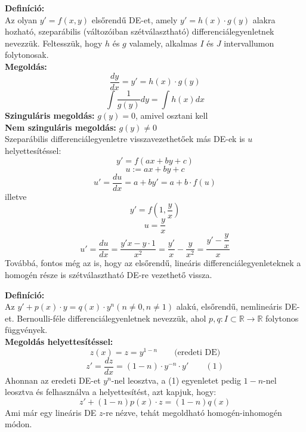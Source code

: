 \documentclass[11pt,a4paper]{article}
\begin{document}
    \begin{tcolorbox}[colback=red!5!white,colframe=red!60!black,title= 1. Szeparábilis és arra visszavezethető DE]
        \textbf{Definíció:} \\
        Az olyan $y' = f(x,y)$ elsőrendű DE-et, amely $y' = h(x) \cdot g(y)$ alakra hozható, szeparábilis (változóiban szétválasztható) differenciálegyenletnek nevezzük. Feltesszük, hogy $h$ és $g$ valamely, alkalmas $I$ és $J$ intervallumon folytonosak. \\
        \textbf{Megoldás:} \\
        $$\dfrac{dy}{dx} = y' = h(x) \cdot g(y)$$
        $$\int\dfrac{1}{g(y)}dy = \int h(x)dx$$
        \textbf{Szinguláris megoldás:} $g(y) = 0$, amivel osztani kell \\
        \textbf{Nem szinguláris megoldás:} $g(y) \neq 0$ \\
        Szeparábilis differenciálegyenletre visszavezethetőek más DE-ek is $u$ helyettesítéssel:
        $$y' = f(ax + by + c)$$
        $$u := ax + by + c$$
        $$u' = \dfrac{du}{dx} = a + by' = a + b \cdot f(u)$$
        illetve
        $$y' = f(1,\dfrac{y}{x})$$
        $$u = \dfrac{y}{x}$$
        $$u' = \dfrac{du}{dx} = \dfrac{y'x - y \cdot 1}{x^2} = \dfrac{y'}{x} - \dfrac{y}{x^2} = \dfrac{y' - \dfrac{y}{x}}{x}$$
        Továbbá, fontos még az is, hogy az elsőrendű, lineáris differenciálegyenleteknek a homogén része is szétválasztható DE-re vezethető vissza.
    \end{tcolorbox}
    \begin{tcolorbox}[colback=red!5!white,colframe=red!60!black,title= 2. Bernoulli-féle DE]
       \textbf{Definíció:} \\
       Az $y' + p(x) \cdot y = q(x) \cdot y^n (n \neq 0, n \neq 1)$ alakú, elsőrendű, nemlineáris DE-et. Bernoulli-féle differenciálegyenletnek nevezzük, ahol $p, q: I \subset \mathbb{R} \rightarrow \mathbb{R}$ folytonos függvények. \\
       \textbf{Megoldás helyettesítéssel:} \\
       $$z(x) = z = y^{1-n} \quad\quad \text{(eredeti DE)}$$
       $$z' = \dfrac{dz}{dx} = (1-n) \cdot y^{-n} \cdot y' \quad\quad (1)$$
       Ahonnan az eredeti DE-et $y^n$-nel leosztva, a (1) egyenletet pedig $1-n$-nel leosztva és felhasználva a helyettesítést, azt kapjuk, hogy:
       $$z' + (1-n)p(x) \cdot z = (1-n)q(x)$$
       Ami már egy lineáris DE $z$-re nézve, tehát megoldható homogén-inhomogén módon.
    \end{tcolorbox}
\end{document}
